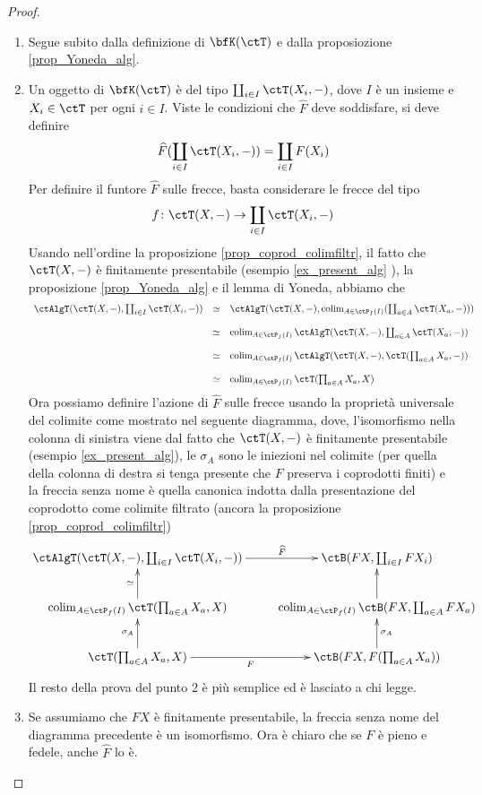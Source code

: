 \begin{proof}\leavevmode 
      \begin{enumerate}
            \item Segue subito dalla definizione di \(\bfK(\ctT)\) e dalla proposiozione \ref{prop_Yoneda_alg}.
            \item Un oggetto di \(\bfK(\ctT)\) è del tipo \(\cop_{i \in I}\ctT(X_i,-)\), dove \(I\) è un insieme
 e \(X_i \in \ctT\) per ogni \(i \in I\). Viste le condizioni che \(\widehat{F}\) deve soddisfare, si deve definire
 \[\widehat{F}(\cop_{i \in I}\ctT(X_i,-)) = \cop_{i \in I}F(X_i)\]
 Per definire il funtore \(\widehat{F}\) sulle frecce, basta considerare le frecce del tipo
 \[f \colon \ctT(X,-) \to \cop_{i \in I}\ctT(X_i,-)\]
 Usando nell'ordine la proposizione \ref{prop_coprod_colimfiltr}, il fatto che \(\ctT(X,-)\) è finitamente presentabile (esempio
 \ref{ex_present_alg} ), la proposizione \ref{prop_Yoneda_alg} e il lemma di Yoneda, abbiamo che
 \[\begin{array}{rcl}
   \ctAlgT(\ctT(X,-),\cop_{i \in I}\ctT(X_i,-)) & \simeq & \ctAlgT(\ctT(X,-),\colim_{A \in \ctP_f(I)}(\cop_{a \in A}\ctT(X_a,-))) \\ \\
                                                   & \simeq & \colim_{A \in \ctP_f(I)}\ctAlgT(\ctT(X,-),\cop_{a \in A}\ctT(X_a,-))   \\ \\
                                                   & \simeq & \colim_{A \in \ctP_f(I)}\ctAlgT(\ctT(X,-),\ctT(\prod_{a \in A}X_a,-))     \\ \\
                                                   & \simeq & \colim_{A \in \ctP_f(I)} \ctT(\prod_{a \in A}X_a,X)
  \end{array}\]
 Ora possiamo definire l'azione di \(\widehat{F}\) sulle frecce usando la proprietà universale del colimite come mostrato
 nel seguente diagramma, dove, l'isomorfismo nella colonna di sinistra viene dal fatto che \(\ctT(X,-)\) è finitamente presentabile
 (esempio \ref{ex_present_alg}),  le \(\sigma_A\) sono le iniezioni nel colimite (per quella della colonna di destra si tenga
 presente che \(F\) preserva i coprodotti finiti) e la freccia senza nome è quella canonica indotta dalla presentazione del
 coprodotto come colimite filtrato (ancora la proposizione \ref{prop_coprod_colimfiltr})
 \[\xymatrix{\ctAlgT(\ctT(X,-),\cop_{i \in I}\ctT(X_i,-)) \ar[r]^-{\widehat{F}} & \ctB(FX,\cop_{i \in I}FX_i) \\
  \colim_{A \in \ctP_f(I)} \ctT(\prod_{a \in A}X_a,X) \ar[u]^{\simeq}
  & \colim_{A \in \ctP_f(I)} \ctB(FX,\cop_{a \in A}FX_a) \ar[u] \\
  \ctT(\prod_{a \in A}X_a,X) \ar[u]^{\sigma_A} \ar[r]_-{F} & \ctB(FX,F(\prod_{a \in A}X_a)) \ar[u]_{\sigma_A} }\]
 Il resto della prova del punto 2 è più semplice ed è lasciato a chi legge.
            \item Se assumiamo che \(FX\) è finitamente presentabile, la freccia senza nome del diagramma precedente è
 un isomorfismo. Ora è chiaro che se \(F\) è pieno e fedele, anche \(\widehat{F}\) lo è.
      \end{enumerate}
\end{proof}


